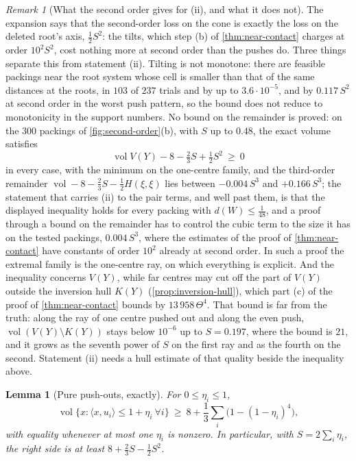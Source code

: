 \documentclass[11pt,reqno]{amsart}
\renewcommand{\_}{\origunderscore\allowbreak}
\numberwithin{equation}{section}
\theoremstyle{plain}
\newtheorem{lem}[thm]{Lemma}
\theoremstyle{definition}
\theoremstyle{remark}
\newtheorem{remark}[thm]{Remark}
\DeclareMathOperator{\vol}{vol}
\begin{document}
\begin{remark}[What the second order gives for (ii), and what it does not]\label{rem:second-order-gap}
The expansion says that the second-order loss on the cone is exactly the
loss on the deleted root's axis, $\tfrac12S^2$: the tilts, which step (b) of
\cref{thm:near-contact} charges at order $10^2S^2$, cost nothing more at
second order than the pushes do. Three things separate this from statement
(ii). Tilting is not monotone: there are feasible packings
near the root system whose cell is smaller than that of the same distances
at the roots, in $103$ of $237$ trials and by up to $3.6\cdot10^{-5}$, and by
$0.117\,S^2$ at second order in the worst push pattern, so the bound does not
reduce to monotonicity in the support numbers. No bound on the remainder is
proved:
on the $300$ packings of \cref{fig:second-order}(b), with $S$ up to $0.48$,
the exact volume satisfies
\[
  \vol V(Y)-8-\tfrac23S+\tfrac12S^2\ \ge\ 0
\]
in every case, with the minimum on the one-centre family, and the third-order
remainder $\vol-8-\tfrac23S-\tfrac12H(\xi,\xi)$ lies between $-0.004\,S^3$ and
$+0.166\,S^3$; the statement that carries (ii) to the pair terms, and well
past them, is that the displayed inequality holds for every packing with
$d(W)\le\tfrac1{48}$, and a proof through a bound on the remainder has to
control the cubic term to the size it has on the tested packings,
$0.004\,S^3$, where the estimates of the proof of \cref{thm:near-contact}
have constants of order $10^2$ already at second order. In such a proof
the extremal family is the one-centre ray, on which everything is
explicit. And the inequality concerns $V(Y)$,
while far centres may cut off the part of $V(Y)$ outside the inversion hull
$K(Y)$ (\cref{prop:inversion-hull}), which part (c) of the proof of
\cref{thm:near-contact} bounds by $13\,958\,\Theta^4$. That bound is far
from the truth: along the ray of one centre pushed out and along the even
push, $\vol(V(Y)\setminus K(Y))$ stays below $10^{-6}$ up to $S=0.197$,
where the bound is $21$, and it grows as the seventh power of $S$ on the
first ray and as the fourth on the second.
Statement (ii) needs a hull estimate of that quality beside the inequality
above.
\end{remark}

\begin{lem}[Pure push-outs, exactly]\label{lem:pure-push}
For $0\le\eta_i\le1$,
\[
  \vol\{x:\langle x,u_i\rangle\le1+\eta_i\ \forall i\}\ \ge\ 8+\frac13\sum_i\bigl(1-(1-\eta_i)^4\bigr),
\]
with equality whenever at most one $\eta_i$ is nonzero. In particular, with
$S=2\sum_i\eta_i$, the right side is at least $8+\tfrac23S-\tfrac12S^2$.
\end{lem}
\end{document}
